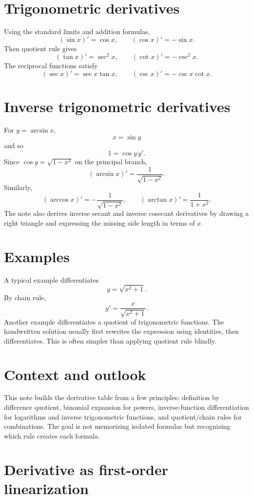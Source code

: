 \section{Trigonometric derivatives}

Using the standard limits and addition formulas,
\[
  (\sin x)'=\cos x,\qquad
  (\cos x)'=-\sin x.
\]
Then quotient rule gives
\[
  (\tan x)'=\sec^2x,\qquad
  (\cot x)'=-\csc^2x.
\]
The reciprocal functions satisfy
\[
  (\sec x)'=\sec x\tan x,\qquad
  (\csc x)'=-\csc x\cot x.
\]

\section{Inverse trigonometric derivatives}

For $y=\arcsin x$,
\[
  x=\sin y
\]
and so
\[
  1=\cos y\,y'.
\]
Since $\cos y=\sqrt{1-x^2}$ on the principal branch,
\[
  (\arcsin x)'=\frac1{\sqrt{1-x^2}}.
\]
Similarly,
\[
  (\arccos x)'=-\frac1{\sqrt{1-x^2}},\qquad
  (\arctan x)'=\frac1{1+x^2}.
\]
The note also derives inverse secant and inverse cosecant derivatives by drawing a right triangle and expressing the missing side length in terms of $x$.

\section{Examples}

A typical example differentiates
\[
  y=\sqrt{x^2+1}.
\]
By chain rule,
\[
  y'=\frac{x}{\sqrt{x^2+1}}.
\]
Another example differentiates a quotient of trigonometric functions.  The handwritten solution usually first rewrites the expression using identities, then differentiates.  This is often simpler than applying quotient rule blindly.

\section{Context and outlook}

This note builds the derivative table from a few principles: definition by difference quotient, binomial expansion for powers, inverse-function differentiation for logarithms and inverse trigonometric functions, and quotient/chain rules for combinations.  The goal is not memorizing isolated formulas but recognizing which rule creates each formula.

\section{Derivative as first-order linearization}


